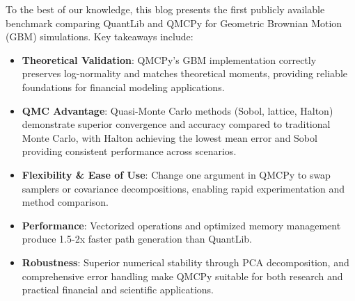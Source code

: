 \begin{tcolorbox}[title=Takeaways,colback=blue!1,colframe=blue!30!black]
To the best of our knowledge, this blog presents the first publicly available
benchmark comparing QuantLib and QMCPy for Geometric Brownian Motion (GBM)
simulations. Key takeaways include:
\begin{itemize}
    \item \textbf{Theoretical Validation}: QMCPy's GBM implementation correctly
    preserves log-normality and matches theoretical moments, providing reliable
    foundations for financial modeling applications.
    \item \textbf{QMC Advantage}: Quasi-Monte Carlo methods (Sobol, lattice,
    Halton) demonstrate superior convergence and accuracy compared to
    traditional Monte Carlo, with Halton achieving the lowest mean error and
    Sobol providing consistent performance across scenarios.
    \item \textbf{Flexibility \& Ease of Use}: Change one argument in QMCPy to
    swap samplers or covariance decompositions, enabling rapid experimentation
    and method comparison.
    \item \textbf{Performance}: Vectorized operations and optimized memory
    management produce 1.5-2x faster path generation than QuantLib.
    \item \textbf{Robustness}: Superior numerical stability through PCA
    decomposition, and comprehensive error handling make QMCPy suitable for both
    research and practical financial and scientific applications.
\end{itemize}
\end{tcolorbox}





